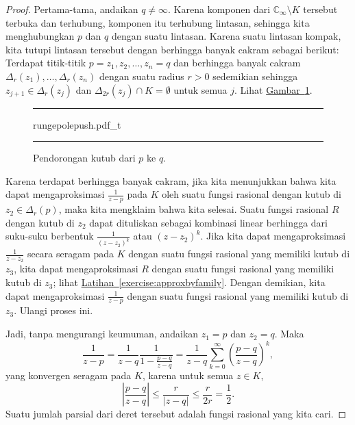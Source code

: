 \documentclass[12pt,openany]{book}
\newcommand{\sabs}[1]{\lvert {#1} \rvert}
\newcommand{\abs}[1]{\left\lvert {#1} \right\rvert}
\newcommand{\C}{{\mathbb{C}}}
\theoremstyle{plain}
\theoremstyle{remark}
\theoremstyle{definition}
\newenvironment{myfig}{%
\begin{figure}[h!t]
\noindent\rule{\textwidth}{0.5pt}\vspace{12pt}\par\centering}%
{\par\noindent\rule{\textwidth}{0.5pt}
\end{figure}}
\theoremstyle{exercise}
\theoremstyle{example}
\newcommand{\figureref}[1]{\hyperref[#1]{Gambar~\ref*{#1}}}
\newcommand{\exerciseref}[1]{\hyperref[#1]{Latihan~\ref*{#1}}}
\begin{document}
\begin{proof}
Pertama-tama, andaikan $q \neq \infty$.
Karena komponen dari $\C_\infty \setminus K$ tersebut terbuka dan terhubung, komponen itu
terhubung lintasan,
sehingga kita menghubungkan $p$ dan $q$ dengan suatu lintasan.
Karena suatu lintasan kompak,
kita tutupi lintasan tersebut dengan berhingga banyak cakram sebagai berikut: 
Terdapat titik-titik $p=z_1,z_2,\ldots,z_n=q$ dan
berhingga banyak cakram $\Delta_{r}(z_1),\ldots,\Delta_{r}(z_n)$
dengan suatu radius $r > 0$
sedemikian sehingga $z_{j+1} \in \Delta_{r}(z_j)$
dan $\Delta_{2r}(z_j) \cap K = \emptyset$ untuk semua $j$.
Lihat \figureref{fig:rungepolepush}.

\begin{myfig}
{rungepolepush.pdf_t}
\caption{Pendorongan kutub dari $p$ ke $q$.\label{fig:rungepolepush}}
\end{myfig}

Karena terdapat berhingga banyak cakram, jika kita menunjukkan bahwa kita dapat mengaproksimasi
$\frac{1}{z-p}$ pada $K$ oleh suatu fungsi rasional dengan kutub di $z_2 \in
\Delta_r(p)$, maka kita mengklaim bahwa kita selesai.  Suatu fungsi rasional $R$ dengan kutub
di $z_2$ dapat dituliskan sebagai
kombinasi linear berhingga dari suku-suku berbentuk $\frac{1}{{(z-z_2)}^k}$
atau $(z-z_2)^k$.  Jika kita dapat mengaproksimasi $\frac{1}{z-z_2}$ secara seragam pada $K$ dengan suatu fungsi rasional
yang memiliki kutub di $z_3$, kita dapat mengaproksimasi $R$ dengan suatu fungsi rasional
yang memiliki kutub di $z_3$; lihat \exerciseref{exercise:approxbyfamily}.
Dengan demikian, kita dapat mengaproksimasi $\frac{1}{z-p}$ dengan suatu fungsi rasional yang memiliki kutub di $z_3$.
Ulangi proses ini.

Jadi, tanpa mengurangi keumuman, andaikan $z_1=p$ dan $z_2=q$.
Maka
\begin{equation*}
\frac{1}{z-p}
=
\frac{1}{z-q}
\frac{1}{1-\frac{p-q}{z-q}}
=
\frac{1}{z-q}
\sum_{k=0}^\infty
{\left(\frac{p-q}{z-q}\right)}^k ,
\end{equation*}
yang konvergen seragam pada $K$, karena untuk semua $z \in K$,
\begin{equation*}
\abs{\frac{p-q}{z-q}}
\leq 
\frac{r}{\sabs{z-q}}
\leq
\frac{r}{2r} = \frac{1}{2} .
\end{equation*}
Suatu jumlah parsial dari deret tersebut adalah fungsi rasional yang kita cari.


\end{proof}
\end{document}
